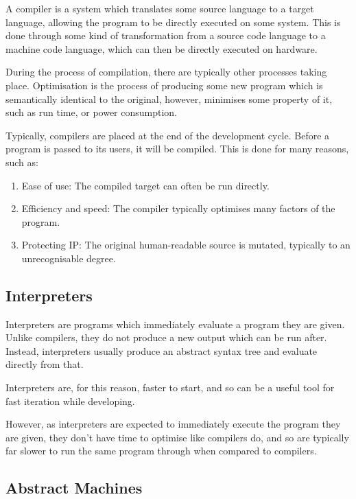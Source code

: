 A compiler is a system which translates some source language to a target language, allowing the program to be directly executed on some system. This is done through some kind of transformation from a source code language to a machine code language, which can then be directly executed on hardware. 

During the process of compilation, there are typically other processes taking place. Optimisation is the process of producing some new program which is semantically identical to the original, however, minimises some property of it, such as run time, or power consumption.

Typically, compilers are placed at the end of the development cycle. Before a program is passed to its users, it will be compiled. This is done for many reasons, such as:
\begin{enumerate}
    \item Ease of use: The compiled target can often be run directly\cite{PortabilityofC}.
    \item Efficiency and speed: The compiler typically optimises many factors of the program\cite{UnifiedOptimisations, HPCOPtimisations, CompCert}.
    \item Protecting IP: The original human-readable source is mutated, typically to an unrecognisable degree\cite{CompilerObfuscationSurvey, ASMObfuscation}.
\end{enumerate}

\subsection{Interpreters}

Interpreters are programs which immediately evaluate a program they are given. Unlike compilers, they do not produce a new output which can be run after. Instead, interpreters usually produce an abstract syntax tree and evaluate directly from that\cite{InterpreterStructure}.

Interpreters are, for this reason, faster to start, and so can be a useful tool for fast iteration while developing\cite{OptimisingInterpreters, InterpreterStructure}. 

However, as interpreters are expected to immediately execute the program they are given, they don't have time to optimise like compilers do, and so are typically far slower to run the same program through when compared to compilers\cite{CompilersAndInterpretersJava, InterpreterStructure}.

\subsection{Abstract Machines}

